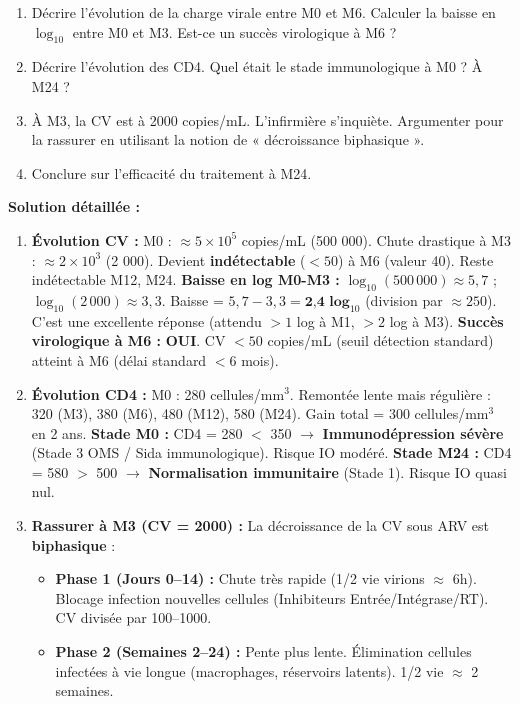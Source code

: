 \documentclass[11pt]{article}
\begin{document}
\begin{exoresolu}
\begin{popfigure}
\end{popfigure}
\begin{enumerate}
    \item Décrire l'évolution de la charge virale entre M0 et M6. Calculer la baisse en $\log_{10}$ entre M0 et M3. Est-ce un succès virologique à M6 ?
    \item Décrire l'évolution des CD4. Quel était le stade immunologique à M0 ? À M24 ?
    \item À M3, la CV est à 2000 copies/mL. L'infirmière s'inquiète. Argumenter pour la rassurer en utilisant la notion de « décroissance biphasique ».
    \item Conclure sur l'efficacité du traitement à M24.
\end{enumerate}
\tcblower
\textbf{Solution détaillée :}
\begin{enumerate}
    \item \textbf{Évolution CV :} M0 : $\approx 5 \times 10^5$ copies/mL (500 000). Chute drastique à M3 : $\approx 2 \times 10^3$ (2 000). Devient \textbf{indétectable} ($< 50$) à M6 (valeur 40). Reste indétectable M12, M24.
    \textbf{Baisse en log M0-M3 :} $\log_{10}(500\,000) \approx 5,7$ ; $\log_{10}(2\,000) \approx 3,3$. Baisse = $5,7 - 3,3 = \textbf{2,4 log}_{10}$ (division par $\approx 250$). C'est une excellente réponse (attendu $> 1$ log à M1, $> 2$ log à M3).
    \textbf{Succès virologique à M6 :} \textbf{OUI}. CV $< 50$ copies/mL (seuil détection standard) atteint à M6 (délai standard $< 6$ mois).
    \item \textbf{Évolution CD4 :} M0 : 280 cellules/mm$^3$. Remontée lente mais régulière : 320 (M3), 380 (M6), 480 (M12), 580 (M24). Gain total = 300 cellules/mm$^3$ en 2 ans.
    \textbf{Stade M0 :} CD4 = 280 $<$ 350 $\rightarrow$ \textbf{Immunodépression sévère} (Stade 3 OMS / Sida immunologique). Risque IO modéré.
    \textbf{Stade M24 :} CD4 = 580 $>$ 500 $\rightarrow$ \textbf{Normalisation immunitaire} (Stade 1). Risque IO quasi nul.
    \item \textbf{Rassurer à M3 (CV = 2000) :} La décroissance de la CV sous ARV est \textbf{biphasique} :
    \begin{itemize}
        \item \textbf{Phase 1 (Jours 0--14) :} Chute très rapide (1/2 vie virions $\approx$ 6h). Blocage infection nouvelles cellules (Inhibiteurs Entrée/Intégrase/RT). CV divisée par 100--1000.
        \item \textbf{Phase 2 (Semaines 2--24) :} Pente plus lente. Élimination cellules infectées à vie longue (macrophages, réservoirs latents). 1/2 vie $\approx$ 2 semaines.

\end{itemize}
\end{enumerate}
\end{exoresolu}
\end{document}
